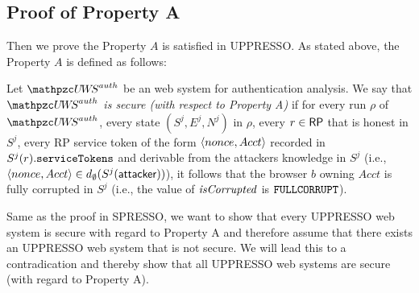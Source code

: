   \subsection{Proof of Property A}
  Then we prove the Property $A$ is satisfied in UPPRESSO.
  As stated above, the Property $A$ is defined as follows:
  \begin{definition}\label{def:uppresso-security-property} 
    Let $\uppressoauthwebsystem$ be an \uppresso web system 
    for authentication analysis. We say that 
    \emph{$\uppressoauthwebsystem$ is secure 
    (with respect to Property A)} if for every run $\rho$ of 
    $\uppressoauthwebsystem$, every state $(S^j, E^j, N^j)$ in 
    $\rho$, every $r\in \mathsf{RP}$ that is honest in $S^j$, 
    every RP service token of the form $\langle {{}nonce, Acct} \rangle$ 
    recorded in $S^j(r).\mathtt{serviceTokens}$ and derivable 
    from the attackers knowledge in $S^j$ (i.e., 
    $\langle {{}nonce, Acct} \rangle \in 
    d_{\emptyset}(S^j(\mathsf{attacker}))$), it follows that the 
    browser $b$ owning $Acct$ is fully corrupted in $S^j$ 
    (i.e., the value of $\mathit{isCorrupted}$ is $\mathtt{FULLCORRUPT}$). 
  \end{definition}
  
  
  
  Same as the proof in SPRESSO, we want to show that every UPPRESSO web system is secure with regard to Property A and therefore assume that there exists an UPPRESSO web system that is not secure. We will lead this to a contradication and thereby show that all UPPRESSO web systems are secure (with regard to Property A).
  
